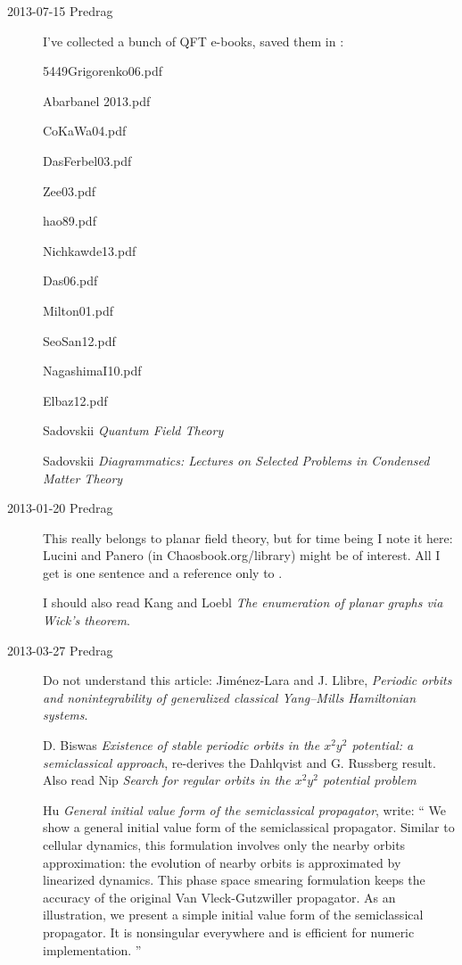 \begin{description}
\item[2013-07-15 Predrag] I've collected a bunch of QFT e-books, saved
them in :

5449Grigorenko06.pdf

Abarbanel 2013.pdf

CoKaWa04.pdf

DasFerbel03.pdf

Zee03.pdf

hao89.pdf

Nichkawde13.pdf

Das06.pdf

Milton01.pdf

SeoSan12.pdf

NagashimaI10.pdf

Elbaz12.pdf

Sadovskii {\em Quantum Field Theory}

Sadovskii
{\em Diagrammatics: Lectures on Selected Problems in Condensed Matter Theory}





\item[2013-01-20  Predrag]
This really belongs to planar field theory, but for time being I note
it here: Lucini and Panero (in Chaosbook.org/library)
might be of interest. All I get is one sentence and a reference only
to .

I should also read Kang and Loebl
{\em The enumeration of planar graphs via {Wick}'s theorem}.

\item[2013-03-27  Predrag] Do not understand this article:
Jim\'enez-Lara and J. Llibre,
{\em Periodic orbits and nonintegrability of generalized
classical {Yang--Mills Hamiltonian} systems}.

                                                \toCB
D. Biswas \etal{} {\em Existence of stable periodic orbits
in the $x^2y^2$ potential: a semiclassical approach}, re-derives the
Dahlqvist and G. Russberg result. Also read Nip
\etal{} {\em Search for regular orbits in the $x^2y^2$
potential problem}

Hu
{\em General initial value form of the semiclassical propagator},
write: ``
We show a general initial value form of the semiclassical propagator.
Similar to cellular dynamics, this formulation involves only the
nearby orbits approximation: the evolution of nearby orbits is
approximated by linearized dynamics. This phase space smearing
formulation keeps the accuracy of the original Van Vleck-Gutzwiller
propagator. As an illustration, we present a simple initial value
form of the semiclassical propagator. It is nonsingular everywhere
and is efficient for numeric implementation.
''


\end{description}
